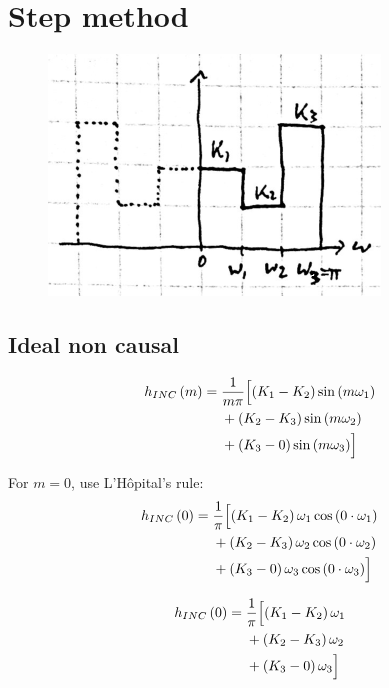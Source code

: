 \documentclass{article}
\begin{document}
\section{Step method}
\begin{figure}[!ht]
    \includegraphics{step}
\end{figure}
\subsection{Ideal non causal}
\begin{equation}
\begin{aligned}
    h_{INC}\left(m\right) = {} & \frac{1}{m\pi}\Bigl[\left(K_1-K_2\right)\sin\left(m\omega_1\right) \\
    & {} + \left(K_2-K_3\right)\sin\left(m\omega_2\right) \\
    & {} + \left(K_3-0\right)\sin\left(m\omega_3\right)\Bigr]
\end{aligned}
\end{equation}

For $m = 0$, use L'Hôpital's rule:
\begin{equation}
\begin{aligned}
    h_{INC}\left(0\right) = {} & \frac{1}{\pi}\Bigl[\left(K_1-K_2\right)\omega_1\cos\left(0\cdot\omega_1\right) \\
    & {} + \left(K_2-K_3\right)\omega_2\cos\left(0\cdot\omega_2\right) \\
    & {} + \left(K_3-0\right)\omega_3\cos\left(0\cdot\omega_3\right)\Bigr]
\end{aligned}
\end{equation}

\begin{equation}
\begin{aligned}
    h_{INC}\left(0\right) = {} & \frac{1}{\pi}\Bigl[\left(K_1-K_2\right)\omega_1 \\
    & {} + \left(K_2-K_3\right)\omega_2 \\
    & {} + \left(K_3-0\right)\omega_3\Bigr]
\end{aligned}
\end{equation}
\end{document}
